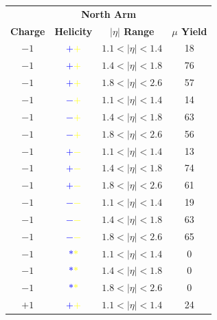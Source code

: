 \begin{table}
  \centering
  \begin{tabular}{cccc}
    \toprule
    \multicolumn{4}{c}{\textbf{North Arm}} \\ 
    \textbf{Charge} & 
    \textbf{Helicity} & 
    \textbf{$\vert\eta\vert$ Range} &
    \textbf{$\mu$ Yield} \\ 
    \midrule
    $-1$ &\textbf{\textcolor{blue}{$+$}\textcolor{yellow}{$+$}} & $1.1 < \vert\eta\vert < 1.4$ & 18 \\
    $-1$ &\textbf{\textcolor{blue}{$+$}\textcolor{yellow}{$+$}} & $1.4 < \vert\eta\vert < 1.8$ & 76 \\
    $-1$ &\textbf{\textcolor{blue}{$+$}\textcolor{yellow}{$+$}} & $1.8 < \vert\eta\vert < 2.6$ & 57 \\
    $-1$ &\textbf{\textcolor{blue}{$-$}\textcolor{yellow}{$+$}} & $1.1 < \vert\eta\vert < 1.4$ & 14 \\
    $-1$ &\textbf{\textcolor{blue}{$-$}\textcolor{yellow}{$+$}} & $1.4 < \vert\eta\vert < 1.8$ & 63 \\
    $-1$ &\textbf{\textcolor{blue}{$-$}\textcolor{yellow}{$+$}} & $1.8 < \vert\eta\vert < 2.6$ & 56 \\
    $-1$ &\textbf{\textcolor{blue}{$+$}\textcolor{yellow}{$-$}} & $1.1 < \vert\eta\vert < 1.4$ & 13 \\
    $-1$ &\textbf{\textcolor{blue}{$+$}\textcolor{yellow}{$-$}} & $1.4 < \vert\eta\vert < 1.8$ & 74 \\
    $-1$ &\textbf{\textcolor{blue}{$+$}\textcolor{yellow}{$-$}} & $1.8 < \vert\eta\vert < 2.6$ & 61 \\
    $-1$ &\textbf{\textcolor{blue}{$-$}\textcolor{yellow}{$-$}} & $1.1 < \vert\eta\vert < 1.4$ & 19 \\
    $-1$ &\textbf{\textcolor{blue}{$-$}\textcolor{yellow}{$-$}} & $1.4 < \vert\eta\vert < 1.8$ & 63 \\
    $-1$ &\textbf{\textcolor{blue}{$-$}\textcolor{yellow}{$-$}} & $1.8 < \vert\eta\vert < 2.6$ & 65 \\
    $-1$ &\textbf{\textcolor{blue}{$*$}\textcolor{yellow}{$*$}} & $1.1 < \vert\eta\vert < 1.4$ & 0 \\
    $-1$ &\textbf{\textcolor{blue}{$*$}\textcolor{yellow}{$*$}} & $1.4 < \vert\eta\vert < 1.8$ & 0 \\
    $-1$ &\textbf{\textcolor{blue}{$*$}\textcolor{yellow}{$*$}} & $1.8 < \vert\eta\vert < 2.6$ & 0 \\
    $+1$ &\textbf{\textcolor{blue}{$+$}\textcolor{yellow}{$+$}} & $1.1 < \vert\eta\vert < 1.4$ & 24 \\

\end{tabular}
\end{table}
